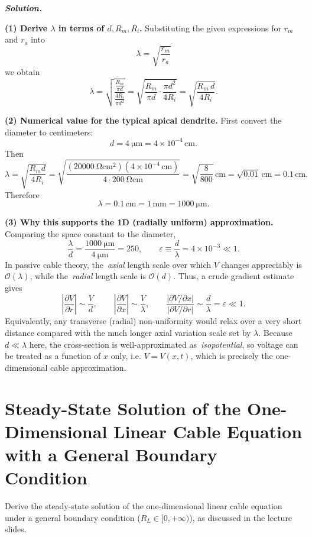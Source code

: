 \documentclass{article}
\newif\ifsolutionclearpage
\newenvironment{solution}{%
    \ifsolutionclearpage\clearpage\fi
    \global\solutionclearpagetrue
    \par\noindent\begin{solutionbox}\textbf{\textit{Solution.}}\par\medskip\itshape
}{%
    \end{solutionbox}
}
\begin{document}
\begin{solution}
\textbf{(1) Derive $\lambda$ in terms of $d, R_m, R_i$.}
Substituting the given expressions for $r_m$ and $r_a$ into
\[
\lambda=\sqrt{\frac{r_m}{r_a}}
\]
we obtain
\[
\lambda
=\sqrt{\frac{\frac{R_m}{\pi d}}{\frac{4R_i}{\pi d^2}}}
=\sqrt{\frac{R_m}{\pi d}\cdot\frac{\pi d^2}{4R_i}}
=\sqrt{\frac{R_m\,d}{4R_i}}.
\]

\medskip
\textbf{(2) Numerical value for the typical apical dendrite.}
First convert the diameter to centimeters:
\[
 d=\SI{4}{\micro\meter}=4\times 10^{-4}\,\si{\centi\meter}.
\]
Then
\[
\lambda
=\sqrt{\frac{R_m d}{4R_i}}
=\sqrt{\frac{(\SI{20000}{\ohm\centi\meter\squared})(4\times 10^{-4}\,\si{\centi\meter})}{4\cdot \SI{200}{\ohm\centi\meter}}}
=\sqrt{\frac{8}{800}}\,\si{\centi\meter}
=\sqrt{0.01}\,\si{\centi\meter}
=0.1\,\si{\centi\meter}.
\]
Therefore
\[
\lambda=0.1\,\si{\centi\meter}=1\,\si{\milli\meter}=\SI{1000}{\micro\meter}.
\]

\medskip
\textbf{(3) Why this supports the 1D (radially uniform) approximation.}
Comparing the space constant to the diameter,
\[
\frac{\lambda}{d}=\frac{\SI{1000}{\micro\meter}}{\SI{4}{\micro\meter}}=250,
\qquad
\varepsilon\equiv\frac{d}{\lambda}=4\times 10^{-3}\ll 1.
\]
In passive cable theory, the \,\emph{axial} length scale over which $V$ changes appreciably is $\mathcal{O}(\lambda)$, while the \,\emph{radial} length scale is $\mathcal{O}(d)$.
Thus, a crude gradient estimate gives
\[
\left|\frac{\partial V}{\partial r}\right|\sim \frac{V}{d},
\qquad
\left|\frac{\partial V}{\partial x}\right|\sim \frac{V}{\lambda},
\qquad
\frac{|\partial V/\partial x|}{|\partial V/\partial r|}\sim \frac{d}{\lambda}=\varepsilon\ll 1.
\]
Equivalently, any transverse (radial) non-uniformity would relax over a very short distance compared with the much longer axial variation scale set by $\lambda$.
Because $d\ll\lambda$ here, the cross-section is well-approximated as \,\emph{isopotential}, so voltage can be treated as a function of $x$ only, i.e.
$V=V(x,t)$, which is precisely the one-dimensional cable approximation.
\end{solution}

\clearpage

\section{Steady-State Solution of the One-Dimensional Linear Cable Equation with a General Boundary Condition}

Derive the steady-state solution of the one-dimensional linear cable equation under a general boundary condition (\(R_L\in[0,+\infty)\)), as discussed in the lecture slides.
\end{document}
